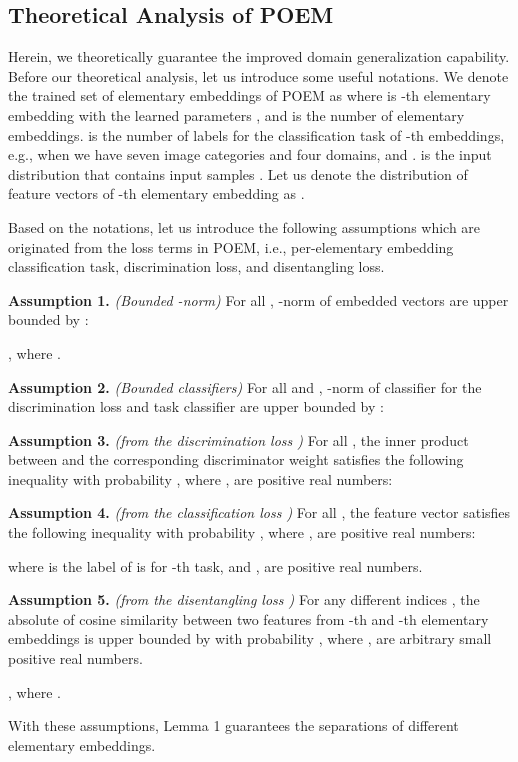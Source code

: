 \documentclass[letterpaper]{article} \usepackage{aaai23}  \usepackage{times}  \usepackage{helvet}  \usepackage{courier}  \usepackage[hyphens]{url}  \usepackage{graphicx} \urlstyle{rm} \def\UrlFont{\rm}  \usepackage{natbib}  \usepackage{caption} \frenchspacing  \setlength{\pdfpagewidth}{8.5in}  \setlength{\pdfpageheight}{11in}  \usepackage[labelsep=period]{caption}
\begin{document}
\subsection{Theoretical Analysis of POEM}	
Herein, we theoretically guarantee the improved domain generalization capability.
Before our theoretical analysis, let us introduce some useful notations.
We denote the trained set of elementary embeddings of POEM as  where  is -th elementary embedding with the learned parameters , and  is the number of elementary embeddings.  is the number of labels for the classification task of -th embeddings, e.g., when we have seven image categories and four domains,  and .
 is the input distribution that contains input samples .
Let us denote the distribution of feature vectors of -th elementary embedding as .

Based on the notations, let us introduce the following assumptions which are originated from the loss terms in POEM, i.e., per-elementary embedding classification task, discrimination loss, and disentangling loss.

\textbf{Assumption 1.} \textit{(Bounded -norm)} For all , -norm of embedded vectors are upper bounded by :

, where .

\textbf{Assumption 2.} \textit{(Bounded classifiers)} For all  and , -norm of classifier  for the discrimination loss and task classifier  are upper bounded by :




\textbf{Assumption 3.} \textit{(from the discrimination loss )} For all , the inner product between   and the corresponding discriminator weight  satisfies the following inequality with probability , where ,  are positive real numbers:



\textbf{Assumption 4.} \textit{(from the classification loss )} For all , the feature vector  satisfies the following inequality with probability , where ,  are positive real numbers:

where  is the label of  is for -th task, and ,  are positive real numbers.

\textbf{Assumption 5.} \textit{(from the disentangling loss )} For any different indices , the absolute of cosine similarity between two features from -th and -th elementary embeddings is upper bounded by  with probability , where ,  are arbitrary small positive real numbers.

, where .


With these assumptions, Lemma 1 guarantees the separations of different elementary embeddings.
\end{document}
